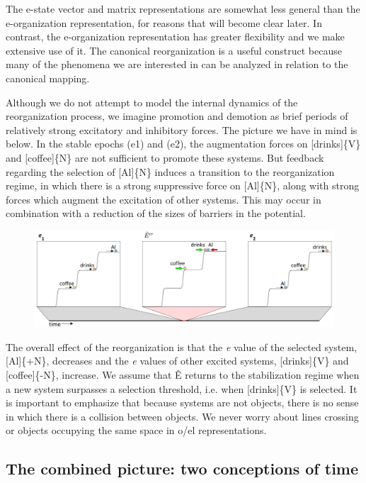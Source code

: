   The e-state vector and matrix representations are somewhat less general than the e-organization representation, for reasons that will become clear later. In contrast, the e-organization representation has greater flexibility and we make extensive use of it. The canonical reorganization is a useful construct because many of the phenomena we are interested in can be analyzed in relation to the canonical mapping.

  Although we do not attempt to model the internal dynamics of the reorganization process, we imagine promotion and demotion as brief periods of relatively strong excitatory and inhibitory forces. The picture we have in mind is below. In the stable epochs (e1) and (e2), the augmentation forces on [drinks]\{V\} and [coffee]\{N\} are not sufficient to promote these systems. But feedback regarding the selection of [Al]\{N\} induces a transition to the reorganization regime, in which there is a strong suppressive force on [Al]\{N\}, along with strong forces which augment the excitation of other systems. This may occur in combination with a reduction of the sizes of barriers in the potential. 

  
\begin{figure}
\includegraphics[width=\textwidth]{figures/Tilsen-img26.png}
\caption{\missingcaption}
\label{fig:}
\end{figure}
 

  The overall effect of the reorganization is that the \textit{e} value of the selected system, [Al]\{+N\}, decreases and the \textit{e} values of other excited systems, [drinks]\{V\} and [coffee]\{-N\}, increase. We assume that Ê returns to the stabilization regime when a new system surpasses a selection threshold, i.e. when [drinks]\{V\} is selected. It is important to emphasize that because systems are not objects, there is no sense in which there is a collision between objects. We never worry about lines crossing or objects occupying the same space in o/el representations.

\subsection{The combined picture: two conceptions of time}

